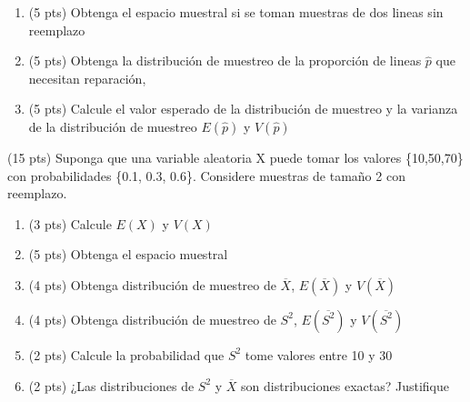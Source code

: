 \documentclass[addpoints]{exam}
\theoremstyle{mytheor}
\begin{document}
\begin{questions}
  \begin{enumerate}
  \item (5 pts) Obtenga el espacio muestral si se toman muestras de dos lineas sin reemplazo
  \item (5 pts) Obtenga la distribución de muestreo de la proporción de lineas $\hat{p}$ que necesitan reparación, 
  \item (5 pts) Calcule el valor esperado de la distribución de muestreo y la varianza de la distribución de muestreo $E(\hat{p})$ y $V(\hat{p})$
  \end{enumerate}
  
  
  \question (15 pts) Suponga que una variable aleatoria X puede tomar los valores \{10,50,70\} con probabilidades \{0.1, 0.3, 0.6\}. Considere muestras de tamaño 2 con reemplazo.
  
  \begin{enumerate}
  \item (3 pts) Calcule $E(X)$ y $V(X)$
  \item (5 pts) Obtenga el espacio muestral
  \item (4 pts) Obtenga distribución de muestreo de $\overline{X}$, $E(\overline{X})$ y $V(\overline{X})$
  \item (4 pts) Obtenga distribución de muestreo de $S^2$, $E(\overline{S^2})$ y $V(\overline{S^2})$
  \item (2 pts) Calcule la probabilidad que $S^2$ tome valores entre 10 y 30
  \item (2 pts) ¿Las distribuciones de $S^2$ y $\overline{X}$ son distribuciones exactas?
  Justifique
  \end{enumerate}

\end{questions}
\end{document}
